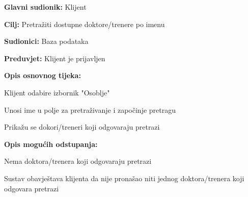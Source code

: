 					\noindent {}
					\begin{packed_item}
						
						\item \textbf{Glavni sudionik:} Klijent
						\item  \textbf{Cilj:} Pretražiti dostupne doktore/trenere po imenu
						\item  \textbf{Sudionici:} Baza podataka
						\item  \textbf{Preduvjet:} Klijent je prijavljen
						\item  \textbf{Opis osnovnog tijeka:}
						
						\item[] \begin{packed_enum}
							
							\item Klijent odabire izbornik "Osoblje"
							\item Unosi ime u polje za pretraživanje i započinje pretragu
							\item Prikažu se dokori/treneri koji odgovaraju pretrazi
						\end{packed_enum}
					
						\item  \textbf{Opis mogućih odstupanja:}
						
						\item[] \begin{packed_item}
							
							\item[3.a] Nema doktora/trenera koji odgovaraju pretrazi
							\item[] \begin{packed_enum}
								
								\item Sustav obavještava klijenta da nije pronašao niti jednog doktora/trenera koji odgovara pretrazi
							\end{packed_enum}
							
						\end{packed_item}
						
					\end{packed_item}
				
